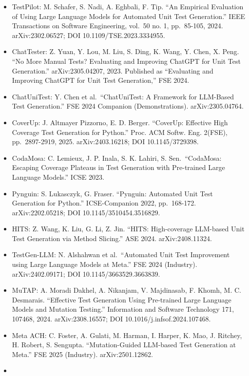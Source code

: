 \documentclass[
  11pt,
]{article}
\providecommand{\tightlist}{%
  \setlength{\itemsep}{0pt}\setlength{\parskip}{0pt}}
\begin{document}
\begin{itemize}
\tightlist
\item
  TestPilot: M. Schafer, S. Nadi, A. Eghbali, F. Tip. ``An Empirical
  Evaluation of Using Large Language Models for Automated Unit Test
  Generation.'' IEEE Transactions on Software Engineering, vol.~50 no.
  1, pp.~85-105, 2024. arXiv:2302.06527; DOI 10.1109/TSE.2023.3334955.
\item
  ChatTester: Z. Yuan, Y. Lou, M. Liu, S. Ding, K. Wang, Y. Chen, X.
  Peng. ``No More Manual Tests? Evaluating and Improving ChatGPT for
  Unit Test Generation.'' arXiv:2305.04207, 2023. Published as
  ``Evaluating and Improving ChatGPT for Unit Test Generation,'' FSE 2024.
\item
  ChatUniTest: Y. Chen et al.~``ChatUniTest: A Framework for LLM-Based
  Test Generation.'' FSE 2024 Companion (Demonstrations).
  arXiv:2305.04764.
\item
  CoverUp: J. Altmayer Pizzorno, E. D. Berger. ``CoverUp: Effective High
  Coverage Test Generation for Python.'' Proc. ACM Softw. Eng. 2(FSE),
  pp.~2897-2919, 2025. arXiv:2403.16218; DOI 10.1145/3729398.
\item
  CodaMosa: C. Lemieux, J. P. Inala, S. K. Lahiri, S. Sen.~``CodaMosa:
  Escaping Coverage Plateaus in Test Generation with Pre-trained Large
  Language Models.'' ICSE 2023.
\item
  Pynguin: S. Lukasczyk, G. Fraser. ``Pynguin: Automated Unit Test
  Generation for Python.'' ICSE-Companion 2022, pp.~168-172.
  arXiv:2202.05218; DOI 10.1145/3510454.3516829.
\item
  HITS: Z. Wang, K. Liu, G. Li, Z. Jin. ``HITS: High-coverage LLM-based
  Unit Test Generation via Method Slicing.'' ASE 2024. arXiv:2408.11324.
\item
  TestGen-LLM: N. Alshahwan et al.~``Automated Unit Test Improvement
  using Large Language Models at Meta.'' FSE 2024 (Industry).
  arXiv:2402.09171; DOI 10.1145/3663529.3663839.
\item
  MuTAP: A. Moradi Dakhel, A. Nikanjam, V. Majdinasab, F. Khomh, M. C.
  Desmarais. ``Effective Test Generation Using Pre-trained Large Language
  Models and Mutation Testing.'' Information and Software Technology
  171, 107468, 2024. arXiv:2308.16557; DOI 10.1016/j.infsof.2024.107468.
\item
  Meta ACH: C. Foster, A. Gulati, M. Harman, I. Harper, K. Mao, J.
  Ritchey, H. Robert, S. Sengupta. ``Mutation-Guided LLM-based Test
  Generation at Meta.'' FSE 2025 (Industry). arXiv:2501.12862.
\item

\end{itemize}
\end{document}
